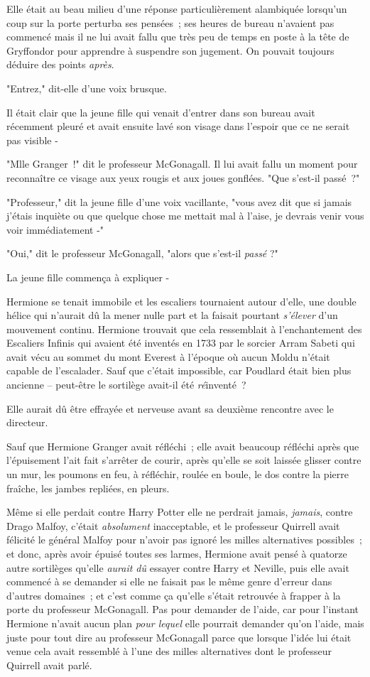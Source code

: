 Elle était au beau milieu d'une réponse particulièrement alambiquée lorsqu'un coup sur la porte perturba ses pensées~; ses heures de bureau n'avaient pas commencé mais il ne lui avait fallu que très peu de temps en poste à la tête de Gryffondor pour apprendre à suspendre son jugement. On pouvait toujours déduire des points \emph{après}.

"Entrez," dit-elle d'une voix brusque.

Il était clair que la jeune fille qui venait d'entrer dans son bureau avait récemment pleuré et avait ensuite lavé son visage dans l'espoir que ce ne serait pas visible -

"Mlle Granger~!" dit le professeur McGonagall. Il lui avait fallu un moment pour reconnaître ce visage aux yeux rougis et aux joues gonflées. "Que s'est-il passé~?"

"Professeur," dit la jeune fille d'une voix vacillante, "vous avez dit que si jamais j'étais inquiète ou que quelque chose me mettait mal à l'aise, je devrais venir vous voir immédiatement -"

"Oui," dit le professeur McGonagall, "alors que s'est-il \emph{passé} ?"

La jeune fille commença à expliquer -

\later

Hermione se tenait immobile et les escaliers tournaient autour d'elle, une double hélice qui n'aurait dû la mener nulle part et la faisait pourtant \emph{s'élever} d'un mouvement continu. Hermione trouvait que cela ressemblait à l'enchantement des Escaliers Infinis qui avaient été inventés en 1733 par le sorcier Arram Sabeti qui avait vécu au sommet du mont Everest à l'époque où aucun Moldu n'était capable de l'escalader. Sauf que c'était impossible, car Poudlard était bien plus ancienne -- peut-être le sortilège avait-il été \emph{ré}inventé~?

Elle aurait dû être effrayée et nerveuse avant sa deuxième rencontre avec le directeur.

Sauf que Hermione Granger avait réfléchi~; elle avait beaucoup réfléchi après que l'épuisement l'ait fait s'arrêter de courir, après qu'elle se soit laissée glisser contre un mur, les poumons en feu, à réfléchir, roulée en boule, le dos contre la pierre fraîche, les jambes repliées, en pleurs.

Même si elle perdait contre Harry Potter elle ne perdrait jamais, \emph{jamais}, contre Drago Malfoy, c'était \emph{absolument} inacceptable, et le professeur Quirrell avait félicité le général Malfoy pour n'avoir pas ignoré les milles alternatives possibles~; et donc, après avoir épuisé toutes ses larmes, Hermione avait pensé à quatorze autre sortilèges qu'elle \emph{aurait dû} essayer contre Harry et Neville, puis elle avait commencé à se demander si elle ne faisait pas le même genre d'erreur dans d'autres domaines~; et c'est comme ça qu'elle s'était retrouvée à frapper à la porte du professeur McGonagall. Pas pour demander de l'aide, car pour l'instant Hermione n'avait aucun plan \emph{pour lequel} elle pourrait demander qu'on l'aide, mais juste pour tout dire au professeur McGonagall parce que lorsque l'idée lui était venue cela avait ressemblé à l'une des milles alternatives dont le professeur Quirrell avait parlé.

